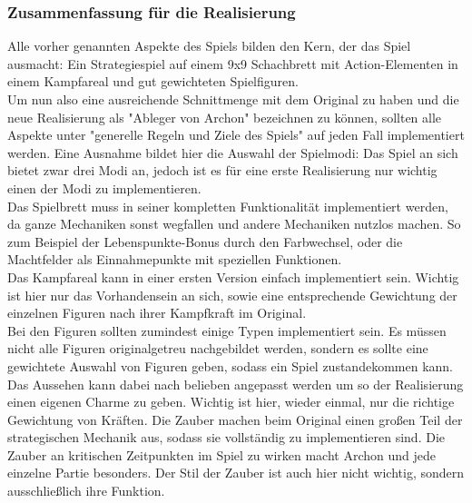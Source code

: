 \subsubsection{Zusammenfassung für die Realisierung}
Alle vorher genannten Aspekte des Spiels bilden den Kern, der das Spiel ausmacht: Ein Strategiespiel auf einem 9x9 Schachbrett mit Action-Elementen in einem Kampfareal und gut gewichteten Spielfiguren.\\
Um nun also eine ausreichende Schnittmenge mit dem Original zu haben und die neue Realisierung als "Ableger von Archon" bezeichnen zu können, sollten alle Aspekte unter "generelle Regeln und Ziele des Spiels" auf jeden Fall implementiert werden. Eine Ausnahme bildet hier die Auswahl der Spielmodi: Das Spiel an sich bietet zwar drei Modi an, jedoch ist es für eine erste Realisierung nur wichtig einen der Modi zu implementieren.\\
Das Spielbrett muss in seiner kompletten Funktionalität implementiert werden, da ganze Mechaniken sonst wegfallen und andere Mechaniken nutzlos machen. So zum Beispiel der Lebenspunkte-Bonus durch den Farbwechsel, oder die Machtfelder als Einnahmepunkte mit speziellen Funktionen.\\
Das Kampfareal kann in einer ersten Version einfach implementiert sein. Wichtig ist hier nur das Vorhandensein an sich, sowie eine entsprechende Gewichtung der einzelnen Figuren nach ihrer Kampfkraft im Original.\\
Bei den Figuren sollten zumindest einige Typen implementiert sein. Es müssen nicht alle Figuren originalgetreu nachgebildet werden, sondern es sollte eine gewichtete Auswahl von Figuren geben, sodass ein Spiel zustandekommen kann. Das Aussehen kann dabei nach belieben angepasst werden um so der Realisierung einen eigenen Charme zu geben. Wichtig ist hier, wieder einmal, nur die richtige Gewichtung von Kräften.
Die Zauber machen beim Original einen großen Teil der strategischen Mechanik aus, sodass sie vollständig zu implementieren sind. Die Zauber an kritischen Zeitpunkten im Spiel zu wirken macht Archon und jede einzelne Partie besonders. Der Stil der Zauber ist auch hier nicht wichtig, sondern ausschließlich ihre Funktion.
